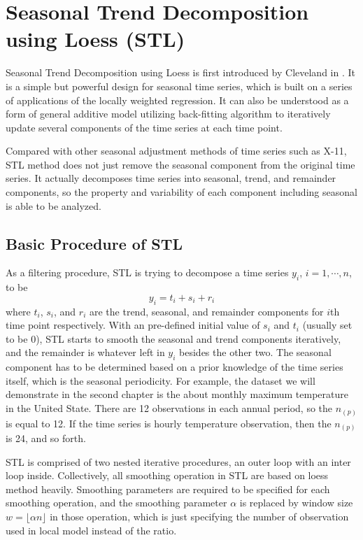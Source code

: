 \section{Seasonal Trend Decomposition using Loess (STL)}
\label{sec:stl}

Seasonal Trend Decomposition using Loess is first introduced by Cleveland in 
\cite{Cleveland:1990}. It is a simple but powerful design for seasonal time
series, which is built on a series of applications of the locally weighted 
regression. It can also be understood as a form of general additive model utilizing
back-fitting algorithm to iteratively update several components of the time series
at each time point.  

Compared with other seasonal adjustment methods of time series such as X-11,
STL method does not just remove the seasonal component from the original 
time series. It actually decomposes time series into seasonal, trend, and remainder
components, so the property and variability of each component including seasonal 
is able to be analyzed. 

\subsection{Basic Procedure of STL}

As a filtering procedure, STL is trying to decompose a time series 
$y_i$, $i=1, \cdots, n$, to be
\begin{equation} 
\label{stlModel}
y_i = t_i + s_i + r_i
\end{equation}
where $t_i$, $s_i$, and $r_i$ are the trend, seasonal, and remainder components
for $i$th time point respectively. With an pre-defined initial value of $s_i$ and 
$t_i$ (usually set to be 0), STL starts to smooth the seasonal and trend components 
iteratively, and the remainder is whatever left in $y_i$ besides the other two. 
The seasonal component has to be determined based on a prior knowledge of the time
series itself, which is the seasonal periodicity. For example, the dataset we will
demonstrate in the second chapter is the about monthly maximum temperature in the
United State. There are 12 observations in each annual period, so the $n_{(p)}$ 
is equal to 12. If the time series is hourly temperature observation, then the
$n_{(p)}$ is 24, and so forth.

STL is comprised of two nested iterative procedures, an outer loop with an inter 
loop inside. Collectively, all smoothing operation in STL are based on loess method
heavily. Smoothing parameters are required to be specified for each smoothing 
operation, and the smoothing parameter $\alpha$ is replaced by window size
$w=\lfloor \alpha n\rfloor$ in those operation, which is just specifying the 
number of observation used in local model instead of the ratio.  

